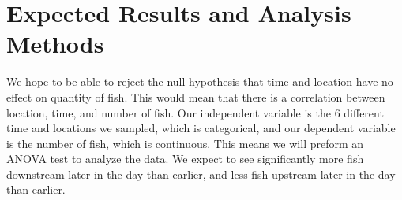 \documentclass{tufte-handout}
\begin{document}
\section{Expected Results and Analysis Methods} We hope to be able to reject the null hypothesis that time and location have no effect on quantity of fish.  This would mean that there is a correlation between location, time, and number of fish.  Our independent variable is the 6 different time and locations we sampled, which is categorical, and our dependent variable is the number of fish, which is continuous.  This means we will preform an ANOVA test to analyze the data.  We expect to see significantly more fish downstream later in the day than earlier, and less fish upstream later in the day than earlier.
\end{document}
